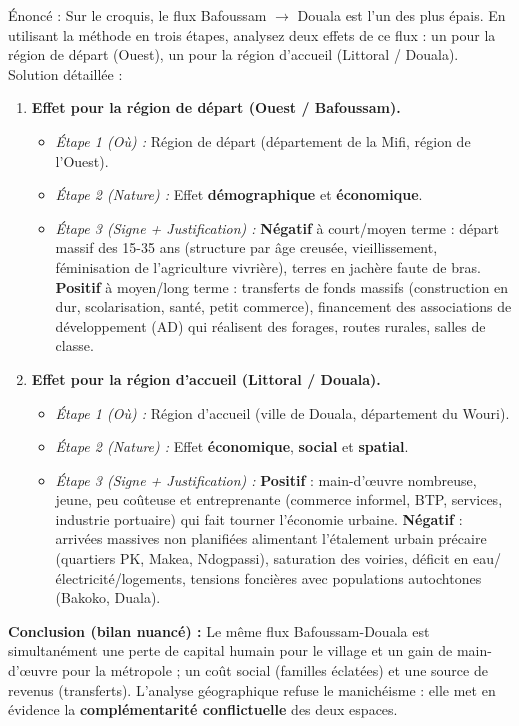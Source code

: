 \documentclass[11pt]{article}
\begin{document}
\begin{exoresolu}
Énoncé : Sur le croquis, le flux Bafoussam $\rightarrow$ Douala est l'un des plus épais. En utilisant la méthode en trois étapes, analysez deux effets de ce flux : un pour la région de départ (Ouest), un pour la région d'accueil (Littoral / Douala).
\tcblower
Solution détaillée :
\begin{enumerate}
\item \textbf{Effet pour la région de départ (Ouest / Bafoussam).}
\begin{itemize}
\item \emph{Étape 1 (Où) :} Région de départ (département de la Mifi, région de l'Ouest).
\item \emph{Étape 2 (Nature) :} Effet \textbf{démographique} et \textbf{économique}.
\item \emph{Étape 3 (Signe + Justification) :} \textbf{Négatif} à court/moyen terme : départ massif des 15-35 ans (structure par âge creusée, vieillissement, féminisation de l'agriculture vivrière), terres en jachère faute de bras. \textbf{Positif} à moyen/long terme : transferts de fonds massifs (construction en dur, scolarisation, santé, petit commerce), financement des associations de développement (AD) qui réalisent des forages, routes rurales, salles de classe.
\end{itemize}
\item \textbf{Effet pour la région d'accueil (Littoral / Douala).}
\begin{itemize}
\item \emph{Étape 1 (Où) :} Région d'accueil (ville de Douala, département du Wouri).
\item \emph{Étape 2 (Nature) :} Effet \textbf{économique}, \textbf{social} et \textbf{spatial}.
\item \emph{Étape 3 (Signe + Justification) :} \textbf{Positif} : main-d'œuvre nombreuse, jeune, peu coûteuse et entreprenante (commerce informel, BTP, services, industrie portuaire) qui fait tourner l'économie urbaine. \textbf{Négatif} : arrivées massives non planifiées alimentant l'étalement urbain précaire (quartiers PK, Makea, Ndogpassi), saturation des voiries, déficit en eau/électricité/logements, tensions foncières avec populations autochtones (Bakoko, Duala).
\end{itemize}
\end{enumerate}
\textbf{Conclusion (bilan nuancé) :} Le même flux Bafoussam-Douala est simultanément une perte de capital humain pour le village et un gain de main-d'œuvre pour la métropole ; un coût social (familles éclatées) et une source de revenus (transferts). L'analyse géographique refuse le manichéisme : elle met en évidence la \textbf{complémentarité conflictuelle} des deux espaces.
\end{exoresolu}
\end{document}
